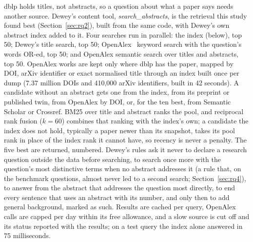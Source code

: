 \documentclass[conference]{IEEEtran}
\begin{document}
dblp holds titles, not abstracts, so a question about what a paper says needs another source. Dewey's
content tool, \emph{search\_abstracts}, is the retrieval this study found best (Section~\ref{sec:rq2}),
built from the same code, with Dewey's own abstract index added to it. Four searches run in parallel:
the index (below), top 50; Dewey's title search, top 50; OpenAlex~\cite{priem2022openalex} keyword
search with the question's words OR-ed, top 50; and OpenAlex semantic search over titles and abstracts,
top 50. OpenAlex works are kept only where dblp has the paper, mapped by DOI, arXiv identifier or exact
normalised title through an index built once per dump (7.37 million DOIs and 410{,}000 arXiv identifiers,
built in 42 seconds). A candidate without an abstract gets one from the index, from its preprint or
published twin, from OpenAlex by DOI, or, for the ten best, from Semantic Scholar or Crossref. BM25 over
title and abstract ranks the pool, and reciprocal rank fusion ($k=60$) combines that ranking with the
index's own; a candidate the index does not hold, typically a paper newer than its snapshot, takes its
pool rank in place of the index rank it cannot have, so recency is never a penalty. The five best are
returned, numbered. Dewey's rules ask it never to declare a research question outside the data before
searching, to search once more with the question's most distinctive terms when no abstract addresses it
(a rule that, on the benchmark questions, almost never led to a second search; Section~\ref{sec:rq4}),
to answer from the abstract that addresses the question most directly, to end every sentence that uses
an abstract with its number, and only then to add general background, marked as such. Results are cached
per query, OpenAlex calls are capped per day within its free allowance, and a slow source is cut off and
its status reported with the results; on a test query the index alone answered in 75 milliseconds.
\end{document}
